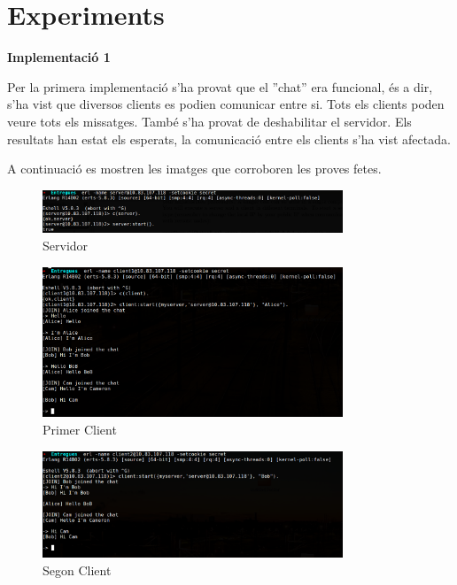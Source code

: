 \documentclass[a4paper, 11pt]{article}
\begin{document}
\section{Experiments}

\begin{center} 
    \textbf{Implementació 1}
\end{center}

Per la primera implementació s'ha provat que el ''chat'' era funcional, és a
dir, s'ha vist que diversos clients es podien comunicar entre si. Tots els
clients poden veure tots els missatges.  També s'ha provat de deshabilitar el
servidor. Els resultats han estat els esperats, la comunicació entre els clients
s'ha vist afectada.

A continuació es mostren les imatges que corroboren les proves fetes.


\begin{figure}[H]
    \centering   
    \includegraphics[width=0.8\textwidth]{figures/Server1_start}
    \caption{Servidor \label{fig:Impl1_Server}}
\end{figure}

\begin{figure}[H]
    \centering
	\includegraphics[width=0.8\textwidth]{figures/Server1_Al}
    \caption{Primer Client \label{fig:Impl1_Al}}
\end{figure}

\begin{figure}[H]
    \centering   
	\includegraphics[width=0.8\textwidth]{figures/Server1_Bob}
    \caption{Segon Client \label{fig:Impl1_Bob}}    
\end{figure}    
    
\end{document}
